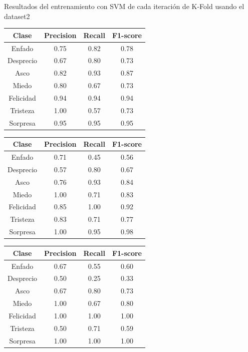 \documentclass{beamer}
\begin{document}
\begin{frame}{Resultados del entrenamiento con SVM de cada iteración de K-Fold usando el dataset2}
\begin{table}[h!]
\begin{minipage}{0.48\linewidth}
\begin{adjustbox}{max width=\textwidth}
\begin{tabular}{|c|c|c|c|}
\hline
\textbf{Clase} & \textbf{Precision} & \textbf{Recall} & \textbf{F1-score}\\
\hline
     Enfado & 0.75 & 0.82 & 0.78\\
     Desprecio & 0.67 & 0.80 & 0.73\\
     Asco & 0.82 & 0.93 & 0.87\\
     Miedo & 0.80 & 0.67 & 0.73\\
     Felicidad & 0.94 & 0.94 & 0.94\\
     Tristeza & 1.00 & 0.57 & 0.73\\
     Sorpresa & 0.95 & 0.95 & 0.95\\
\hline
\end{tabular}
\end{adjustbox}
\end{minipage}\hfill
\begin{minipage}{0.48\linewidth}
\centering
\begin{adjustbox}{max width=\textwidth}
\begin{tabular}{|c|c|c|c|}
\hline
\textbf{Clase} & \textbf{Precision} & \textbf{Recall} & \textbf{F1-score}\\
\hline
     Enfado & 0.71 & 0.45 & 0.56\\
     Desprecio & 0.57 & 0.80 & 0.67\\
     Asco & 0.76 & 0.93 & 0.84\\
     Miedo & 1.00 & 0.71 & 0.83\\
     Felicidad & 0.85 & 1.00 & 0.92\\
     Tristeza & 0.83 & 0.71 & 0.77\\
     Sorpresa & 1.00 & 0.95 & 0.98\\
\hline
\end{tabular}
\end{adjustbox}
\vspace{0.4cm}

\begin{adjustbox}{max width=\textwidth}
\begin{tabular}{|c|c|c|c|}
\hline
\textbf{Clase} & \textbf{Precision} & \textbf{Recall} & \textbf{F1-score}\\
\hline
     Enfado & 0.67 & 0.55 & 0.60\\
     Desprecio & 0.50 & 0.25 & 0.33\\
     Asco & 0.67 & 0.80 & 0.73\\
     Miedo & 1.00 & 0.67 & 0.80\\
     Felicidad & 1.00 & 1.00 & 1.00\\
     Tristeza & 0.50 & 0.71 & 0.59\\
     Sorpresa & 1.00 & 1.00 & 1.00\\
\hline
\end{tabular}
\end{adjustbox}
\end{minipage}
\end{table}
\end{frame}
\end{document}
